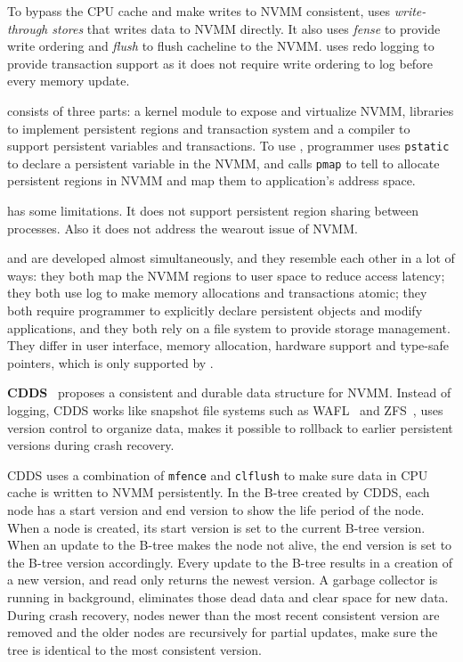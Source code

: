 To bypass the CPU cache and make writes to NVMM consistent, \mnem{} uses
\emph{write-through stores} that writes data to NVMM directly. It also
uses \emph{fense} to provide write ordering and \emph{flush} to flush
cacheline to the NVMM. \mnem{} uses redo logging to provide transaction support
as it does not require write ordering to log before every memory update.

\mnem{} consists of three parts: a kernel module to expose and virtualize NVMM, 
libraries to implement persistent regions and transaction system and
a compiler to support persistent variables and transactions. To use \mnem{},
programmer uses \texttt{pstatic} to declare a persistent variable in the NVMM,
and calls \texttt{pmap} to tell \mnem{} to allocate persistent regions in NVMM
and map them to application's address space.

\mnem{} has some limitations. It does not support persistent region sharing
between processes. Also it does not address the wearout issue of NVMM.

\mnem{} and \nvh{} are developed almost simultaneously, and they resemble each
other in a lot of ways: they both map the NVMM regions to user space to reduce
access latency; they both use log to make memory allocations and transactions
atomic; they both require programmer to explicitly
declare persistent objects and modify applications, and they both rely
on a file system to provide storage management. They differ in user interface,
memory allocation, hardware support and type-safe pointers, which is only
supported by \nvh{}.

\textbf{CDDS}~\cite{cdds} proposes a consistent and durable data structure for
 NVMM.
Instead of logging, CDDS works like snapshot file systems such as
WAFL~\cite{wafl} and ZFS~\cite{zfs}, uses version control to organize data,
makes it possible to rollback to earlier persistent versions during crash
recovery.

CDDS uses a combination of \texttt{mfence} and \texttt{clflush} to make sure
data in CPU cache is written to NVMM persistently.
In the B-tree
created by CDDS, each node has a start version and end version to show the
life period of the node. When a node is created, its start version is set
to the current B-tree version. When an update to the B-tree makes the node
not alive, the end version is set to the B-tree version accordingly.
Every update to the B-tree results in a creation of
a new version, and read only returns the newest version. A garbage collector
is running in background, eliminates those dead data and clear space for
new data. During crash recovery, nodes newer than the most recent consistent
version are removed and the older nodes are recursively for partial updates,
make sure the tree is identical to the most consistent version.

